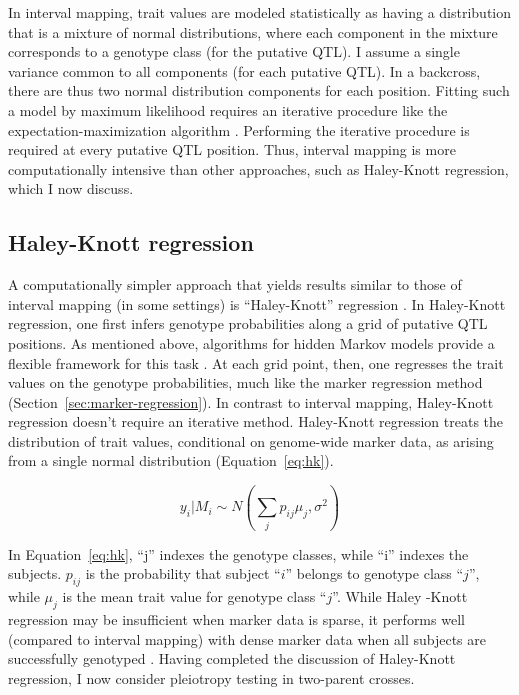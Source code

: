 \documentclass[oneside]{book}\usepackage[]{graphicx}\usepackage[]{color}
\begin{document}
In interval mapping, trait values are modeled statistically as having a 
distribution 
that is a mixture of normal distributions, where each component in the mixture 
corresponds to a genotype class (for the putative QTL). I assume a single variance common to all 
components (for each
putative QTL). In a backcross, there are thus two normal distribution 
components for 
each position. Fitting such a model by 
maximum 
likelihood requires an iterative procedure like the expectation-maximization 
algorithm 
\citep{dempster1977maximum}. Performing the iterative procedure is required at every 
putative QTL position. Thus, interval mapping is more computationally intensive than other approaches, 
such as Haley-Knott regression, which I now discuss.


\subsection{Haley-Knott regression}\label{sec:haley-knott}

A computationally simpler approach that yields results similar to those of interval 
mapping (in some settings) is ``Haley-Knott'' regression \citep{haley1992simple, martinez1992estimating}. 
In Haley-Knott regression, one first infers genotype probabilities along a grid of 
putative QTL positions. As mentioned above, algorithms for hidden Markov models provide 
a flexible framework for this task \citep{broman2006use,broman2009guide}. At each grid point, then, one regresses the trait values on the genotype probabilities, much like the marker regression method (Section~\ref{sec:marker-regression}). In contrast to interval mapping, Haley-Knott regression doesn't require an iterative method. Haley-Knott regression treats the distribution of trait values, conditional on genome-wide marker data, as arising from a single normal distribution (Equation~\ref{eq:hk}). 

\begin{equation}
y_i|M_i \sim N(\sum_j p_{ij}\mu_j, \sigma^2)
\label{eq:hk}
\end{equation}

In Equation~\ref{eq:hk}, ``j'' indexes the genotype classes, while ``i'' indexes the 
subjects. $p_{ij}$ is the probability that subject ``$i$'' belongs to genotype class 
``$j$'', while $\mu_j$ is the mean trait value for genotype class ``$j$''. While Haley
-Knott regression may be insufficient when marker data is sparse, it performs well 
(compared to interval mapping) with dense marker data when all subjects are successfully 
genotyped \citep{broman2009guide}. Having completed the discussion of Haley-Knott regression, 
I now consider pleiotropy testing in two-parent crosses. 
\end{document}
